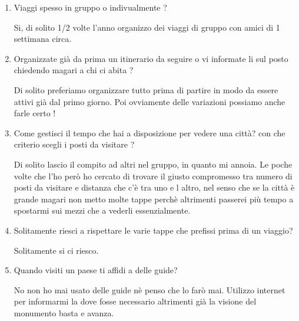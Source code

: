 

\begin{enumerate}

\item Viaggi spesso in gruppo o indivualmente ?

Si, di solito 1/2 volte l'anno organizzo dei viaggi di gruppo con amici di 1 settimana circa.

\item Organizzate già da prima un itinerario da seguire o vi informate li sul posto chiedendo magari a chi ci abita ?

Di solito preferiamo organizzare tutto prima di partire in modo da essere attivi già dal primo giorno. Poi ovviamente delle variazioni possiamo anche farle certo !

\item Come gestisci il tempo che hai a disposizione per vedere una città? con che criterio scegli i posti da visitare ?

Di solito lascio il compito ad altri nel gruppo, in quanto mi annoia. Le poche volte che l'ho però ho cercato di trovare il giusto compromesso tra numero di posti da visitare e distanza che c'è tra uno e l altro, nel senso che se la città è grande magari non metto molte tappe perchè altrimenti passerei più tempo a spostarmi sui mezzi che a vederli essenzialmente.

\item Solitamente riesci a rispettare le varie tappe che prefissi prima di un viaggio?

Solitamente si ci riesco.

\item Quando visiti un paese ti affidi a delle guide?

No non ho mai usato delle guide nè penso che lo farò mai. Utilizzo internet per informarmi la dove fosse necessario altrimenti già la visione del monumento basta e avanza.

\end{enumerate}

\clearpage
{}

